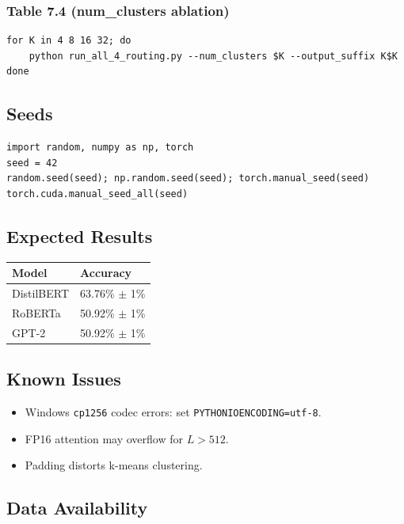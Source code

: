 \subsubsection{Table 7.4 (num\_clusters ablation)}

\begin{lstlisting}
for K in 4 8 16 32; do
    python run_all_4_routing.py --num_clusters $K --output_suffix K$K
done
\end{lstlisting}

\subsection{Seeds}

\begin{lstlisting}
import random, numpy as np, torch
seed = 42
random.seed(seed); np.random.seed(seed); torch.manual_seed(seed)
torch.cuda.manual_seed_all(seed)
\end{lstlisting}

\subsection{Expected Results}

\begin{table}[H]
\centering
\small
\begin{tabular}{ll}
\toprule
\textbf{Model} & \textbf{Accuracy} \\
\midrule
DistilBERT & 63.76\% $\pm$ 1\% \\
RoBERTa & 50.92\% $\pm$ 1\% \\
GPT-2 & 50.92\% $\pm$ 1\% \\
\bottomrule
\end{tabular}
\end{table}

\subsection{Known Issues}

\begin{itemize}
\item Windows \texttt{cp1256} codec errors: set \texttt{PYTHONIOENCODING=utf-8}.
\item FP16 attention may overflow for $L > 512$.
\item Padding distorts k-means clustering.

\end{itemize}
\subsection{Data Availability}

